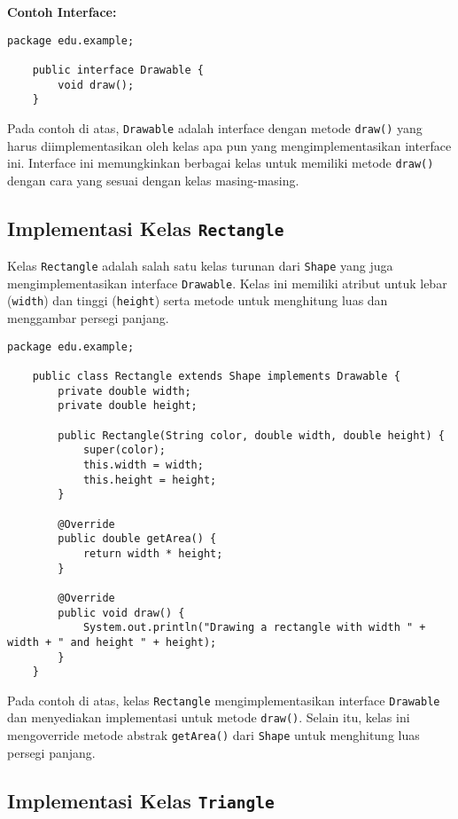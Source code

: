 \textbf{Contoh Interface:}

\begin{lstlisting}[style=JavaStyle, caption={Drawable.java}]
	package edu.example;
	
	public interface Drawable {
		void draw();
	}
\end{lstlisting}

Pada contoh di atas, \texttt{Drawable} adalah interface dengan metode \texttt{draw()} yang harus diimplementasikan oleh kelas apa pun yang mengimplementasikan interface ini. Interface ini memungkinkan berbagai kelas untuk memiliki metode \texttt{draw()} dengan cara yang sesuai dengan kelas masing-masing.

\subsection{Implementasi Kelas \texttt{Rectangle}}

Kelas \texttt{Rectangle} adalah salah satu kelas turunan dari \texttt{Shape} yang juga mengimplementasikan interface \texttt{Drawable}. Kelas ini memiliki atribut untuk lebar (\texttt{width}) dan tinggi (\texttt{height}) serta metode untuk menghitung luas dan menggambar persegi panjang.

\begin{lstlisting}[style=JavaStyle]
	package edu.example;
	
	public class Rectangle extends Shape implements Drawable {
		private double width;
		private double height;
		
		public Rectangle(String color, double width, double height) {
			super(color);
			this.width = width;
			this.height = height;
		}
		
		@Override
		public double getArea() {
			return width * height;
		}
		
		@Override
		public void draw() {
			System.out.println("Drawing a rectangle with width " + width + " and height " + height);
		}
	}
\end{lstlisting}

Pada contoh di atas, kelas \texttt{Rectangle} mengimplementasikan interface \texttt{Drawable} dan menyediakan implementasi untuk metode \texttt{draw()}. Selain itu, kelas ini mengoverride metode abstrak \texttt{getArea()} dari \texttt{Shape} untuk menghitung luas persegi panjang.

\subsection{Implementasi Kelas \texttt{Triangle}}


